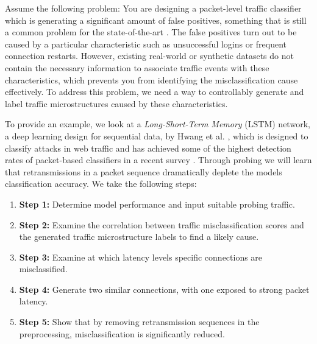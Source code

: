 \documentclass[runningheads]{llncs}
\begin{document}
Assume the following problem: You are designing a packet-level traffic classifier which is generating a significant amount of false positives, something that is still a common problem for the state-of-the-art \cite{nisioti2018intrusion}. The false positives turn out to be caused by a particular characteristic such as unsuccessful logins or frequent connection restarts. However, existing real-world or synthetic datasets do not contain the necessary information to associate traffic events with these characteristics, which prevents you from identifying the misclassification cause effectively. To address this problem, we need a way to controllably generate and label traffic microstructures caused by these characteristics.

To provide an example, we look at a \textit{Long-Short-Term Memory} (LSTM) network, a deep learning design for sequential data, by Hwang et al. \cite{hwang2019lstm}, which is designed to classify attacks in web traffic and has achieved some of the highest detection rates of packet-based classifiers in a recent survey \cite{tahaei2020rise}. Through probing we will learn that retransmissions in a packet sequence dramatically deplete the models classification accuracy. We take the following steps:

\begin{enumerate}
\item [] \textbf{Step 1:} Determine model performance and input suitable probing traffic.
\item [] \textbf{Step 2:} Examine the correlation between traffic misclassification scores and the generated traffic microstructure labels to find a likely cause.%
\item [] \textbf{Step 3:} Examine at which latency levels specific connections are misclassified.

\item [] \textbf{Step 4:} Generate two similar connections, with one exposed to strong packet latency.%
\item [] \textbf{Step 5:} Show that by removing retransmission sequences in the preprocessing, misclassification is significantly reduced.
\end{enumerate}

\end{document}
